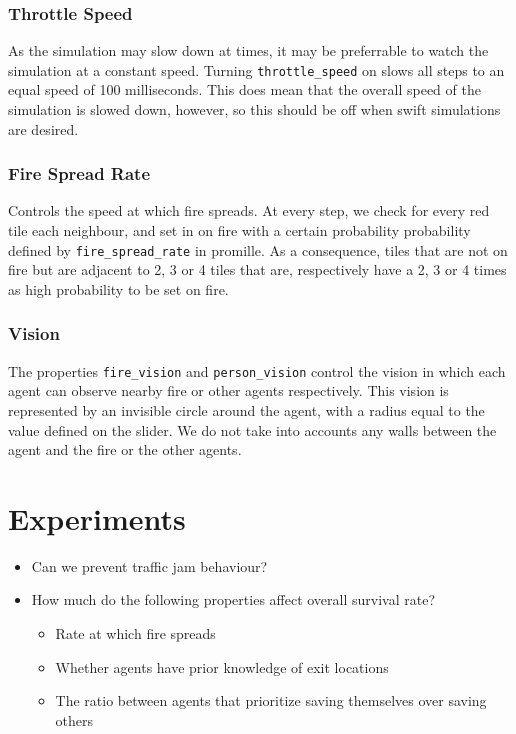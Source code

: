 \documentclass[a4paper]{article}
\begin{document}
\subsubsection{Throttle Speed}
As the simulation may slow down at times, it may be preferrable to watch the simulation at a constant speed. Turning \texttt{throttle\_speed} on slows all steps to an equal speed of 100 milliseconds. This does mean that the overall speed of the simulation is slowed down, however, so this should be off when swift simulations are desired.

\subsubsection{Fire Spread Rate}
Controls the speed at which fire spreads. At every step, we check for every red tile each neighbour, and set in on fire with a certain probability probability defined by \texttt{fire\_spread\_rate} in promille. As a consequence, tiles that are not on fire but are adjacent to 2, 3 or 4 tiles that are, respectively have a 2, 3 or 4 times as high probability to be set on fire.

\subsubsection{Vision}
The properties \texttt{fire\_vision} and \texttt{person\_vision} control the vision in which each agent can observe nearby fire or other agents respectively. This vision is represented by an invisible circle around the agent, with a radius equal to the value defined on the slider. We do not take into accounts any walls between the agent and the fire or the other agents.

\FloatBarrier
\section{Experiments}
\begin{itemize}
\item Can we prevent traffic jam behaviour?
\item How much do the following properties affect overall survival rate?
\begin{itemize}
\item Rate at which fire spreads
\item Whether agents have prior knowledge of exit locations
\item The ratio between agents that prioritize saving themselves over saving others
\end{itemize}
\end{itemize}
\end{document}
